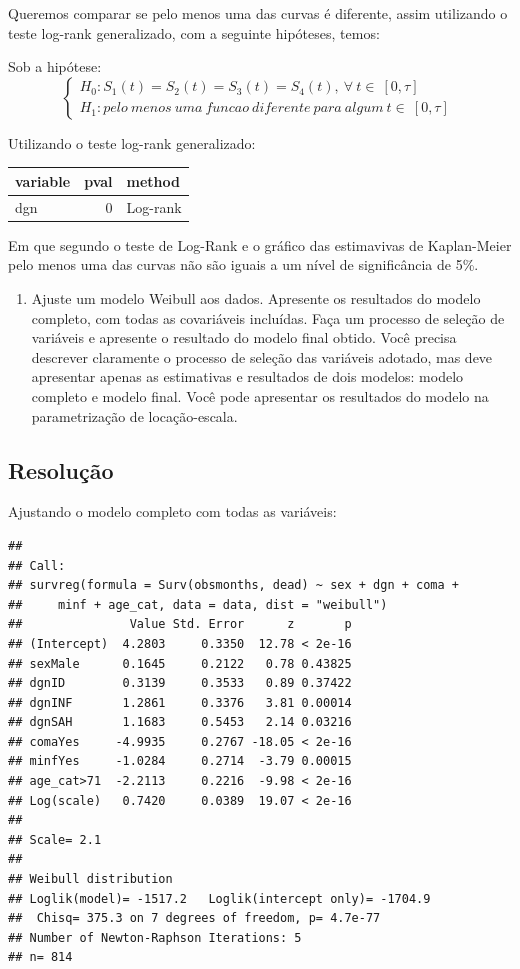 \documentclass[]{article}
\providecommand{\tightlist}{%
  \setlength{\itemsep}{0pt}\setlength{\parskip}{0pt}}
\begin{document}
Queremos comparar se pelo menos uma das curvas é diferente, assim
utilizando o teste log-rank generalizado, com a seguinte hipóteses,
temos:

Sob a hipótese: \[ \left\{ \begin{array}{ll}
H_0: S_1(t)=S_2(t)=S_3(t)=S_4(t), \ \forall \ t \in \ [0,\tau] \\
H_1: pelo \ menos\ uma \ funcao \ diferente  \ para \ algum \ t \in \ [0,\tau] \end{array} \right.\ \]

Utilizando o teste log-rank generalizado:

\begin{longtable}[]{@{}lrl@{}}
\toprule
variable & pval & method\tabularnewline
\midrule
\endhead
dgn & 0 & Log-rank\tabularnewline
\bottomrule
\end{longtable}

Em que segundo o teste de Log-Rank e o gráfico das estimavivas de
Kaplan-Meier pelo menos uma das curvas não são iguais a um nível de
significância de 5\%.

\begin{enumerate}
\def\labelenumi{(\alph{enumi})}
\setcounter{enumi}{1}
\tightlist
\item
  Ajuste um modelo Weibull aos dados. Apresente os resultados do modelo
  completo, com todas as covariáveis incluídas. Faça um processo de
  seleção de variáveis e apresente o resultado do modelo final obtido.
  Você precisa descrever claramente o processo de seleção das variáveis
  adotado, mas deve apresentar apenas as estimativas e resultados de
  dois modelos: modelo completo e modelo final. Você pode apresentar os
  resultados do modelo na parametrização de locação-escala.
\end{enumerate}

\newpage

\subsection{Resolução}\label{resolucao-1}

Ajustando o modelo completo com todas as variáveis:

\begin{verbatim}
## 
## Call:
## survreg(formula = Surv(obsmonths, dead) ~ sex + dgn + coma + 
##     minf + age_cat, data = data, dist = "weibull")
##               Value Std. Error      z       p
## (Intercept)  4.2803     0.3350  12.78 < 2e-16
## sexMale      0.1645     0.2122   0.78 0.43825
## dgnID        0.3139     0.3533   0.89 0.37422
## dgnINF       1.2861     0.3376   3.81 0.00014
## dgnSAH       1.1683     0.5453   2.14 0.03216
## comaYes     -4.9935     0.2767 -18.05 < 2e-16
## minfYes     -1.0284     0.2714  -3.79 0.00015
## age_cat>71  -2.2113     0.2216  -9.98 < 2e-16
## Log(scale)   0.7420     0.0389  19.07 < 2e-16
## 
## Scale= 2.1 
## 
## Weibull distribution
## Loglik(model)= -1517.2   Loglik(intercept only)= -1704.9
##  Chisq= 375.3 on 7 degrees of freedom, p= 4.7e-77 
## Number of Newton-Raphson Iterations: 5 
## n= 814
\end{verbatim}
\end{document}

